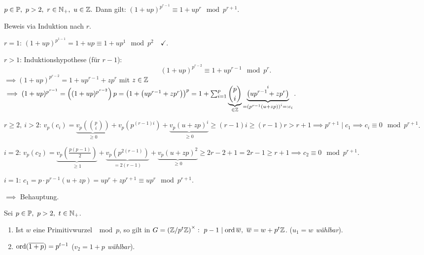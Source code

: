 \documentclass[a4paper,twoside,DIV15,BCOR12mm]{scrbook}
\begin{document}
\begin{lemma}[$(1+p)$--Lemma]\label{lemma:1+p}
    $p\in\mathbb{P},\ p>2,\ r\in \mathbb{N}_+,\ u\in \mathbb{Z}.$ Dann gilt:
    $(1+up)^{p^{r-1}} \equiv 1+up^r \mod p^{r+1}$.
\end{lemma}
\begin{beweis}
    Beweis via Induktion nach $r$.
    \begin{description}

    \item{$r=1$:} $(1+up)^{p^{1-1}}=1+up\equiv1+up^1 \mod p^2\quad
    \checkmark$.\\
    \item{$r>1$:} Induktionshypothese (für $r-1$):
    \[
        (1+up)^{p^{r-2}}\equiv 1+ up^{r-1} \mod p^r.
    \]
    $\implies(1+up)^{p^{r-2}}=1+up^{r-1}+zp^r$ mit $z\in\mathbb{Z}$
    $\implies
    (1+up)^{p^{r-1}}=\left((1+up)^{p^{r-2}}\right)p=\left(1+\left(up^{r-1}+zp^r\right)\right)^p=1+\sum_{i=1}^p
    \underbrace{{p \choose i}}_{\in  \mathbb{Z}}
    \underbrace{\left(up^{r-1}+zp^r\right)}^i_{=\left(p^{r-1}(u+zp)\right)^i=:c_i}$.\\
    \item{$r\geq 2,\ i>2$:} $v_p(c_i)=\underbrace{v_p\left({p \choose
    i}\right)}_{\geq 0} +
    v_p\left(p^{(r-1)i}\right)+\underbrace{v_p(u+zp)^i}_{\geq 0}
    \geq (r-1)i \geq (r-1)r>r+1 \implies p^{r+1} \mid c_1 \implies
    c_i \equiv 0 \mod p^{r+1}$.
    \item{$i=2$:} $v_p(c_2)=\underbrace{v_p\left( \frac{p(p-1)}{2} \right)}_{\geq
    1} + \underbrace{v_p\left( p^{2(r-1)} \right)}_{=2(r-1)} + \underbrace{v_p(u+zp)^2}_{\geq
    0} \geq 2r-2+1=2r-1 \geq r+1 \implies c_2 \equiv 0 \mod p^{r+1}$.
    \item{$i=1$:} $c_1=p\cdot p^{r-1}(u+zp)=up^r+zp^{r+1}\equiv up^r \mod
    p^{r+1}$.
    \end{description}
    $\implies$ Behauptung.
\end{beweis}
\begin{hilfssatz}
    Sei $p\in\mathbb{P},\ p>2,\ t\in \mathbb{N}_+$.
    \begin{enumerate}
        \item Ist $w$ eine Primitivwurzel $\mod p$, so gilt in $G=\left(\mathbb{Z}/p^t
        \mathbb{Z}\right)^{\times}:\ p-1 \mid \mathop{\rm ord}\nolimits \overline w,\ \overline
        w=w+p^t \mathbb{Z}$. (\emph{$u_1=w$ wählbar}).
        \item $\mathop{\rm ord}\nolimits (\overline{1+p})=p^{t-1}$ (\emph{$v_2=1+p$
        wählbar}).
    \end{enumerate}
\end{hilfssatz}
\end{document}

